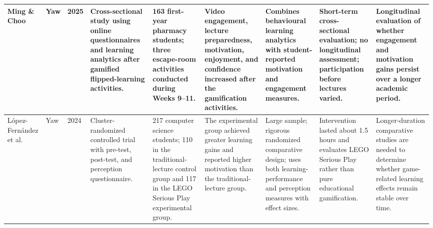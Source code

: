 \documentclass[12pt,a4paper]{article}
\begin{document}
\begin{longtable}{|
L{1.5cm}|
L{1.1cm}|
C{0.7cm}|
L{1.7cm}|
L{1.7cm}|
L{2.2cm}|
L{1.7cm}|
L{1.7cm}|
L{1.9cm}|}
Ming \& Choo &
Yaw &
2025 &
Cross-sectional study using online questionnaires and learning analytics after gamified flipped-learning activities. &
163 first-year pharmacy students; three escape-room activities conducted during Weeks 9--11. &
Video engagement, lecture preparedness, motivation, enjoyment, and confidence increased after the gamification activities. &
Combines behavioural learning analytics with student-reported motivation and engagement measures. &
Short-term cross-sectional evaluation; no longitudinal assessment; participation before lectures varied. &
Longitudinal evaluation of whether engagement and motivation gains persist over a longer academic period.
\tabularnewline
\hline


L\'opez-Fern\'andez et al. &
Yaw &
2024 &
Cluster-randomized controlled trial with pre-test, post-test, and perception questionnaire. &
217 computer science students; 110 in the traditional-lecture control group and 117 in the LEGO Serious Play experimental group. &
The experimental group achieved greater learning gains and reported higher motivation than the traditional-lecture group. &
Large sample; rigorous randomized comparative design; uses both learning-performance and perception measures with effect sizes. &
Intervention lasted about 1.5 hours and evaluates LEGO Serious Play rather than pure educational gamification. &
Longer-duration comparative studies are needed to determine whether game-related learning effects remain stable over time.
\tabularnewline
\hline


\end{longtable}

\normalsize
\renewcommand{\arraystretch}{1}
\end{document}
